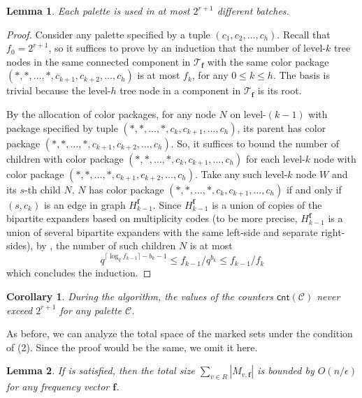 \documentclass[11pt,a4paper]{article}
\newtheorem{lemma}{Lemma}[section]
\newtheorem{corollary}{Corollary}[section]
\newcommand{\ceil}[1]{\lceil #1 \rceil}
\newcommand{\tree}{\mathcal{T}}
\newcommand{\freq}{\mathbf{f}}
\newcommand{\clr}{\mathcal{C}}
\newcommand{\cnt}{\mathsf{cnt}}
\begin{document}
\begin{lemma}\label{palette-cnt}
	Each palette is used in at most $2^{r+1}$ different batches.
\end{lemma}
\begin{proof}
	Consider any palette specified by a tuple $(c_1, c_2, \ldots, c_h)$. Recall that $f_0 = 2^{r+1}$, so it suffices to prove by an induction that the number of level-$k$ tree nodes in the same connected component in $\tree_\freq$ with the same color package $(*, *, \ldots, *, c_{k+1}, c_{k+2}, \ldots, c_h)$ is at most $f_k$, for any $0\leq k\leq h$. The basis is trivial because the level-$h$ tree node in a component in $\tree_{\freq}$ is its root.
	
	By the allocation of color packages, for any node $N$ on level-$(k-1)$ with package specified by tuple $(*, *, \ldots, *, c_k, c_{k+1}, \ldots, c_h)$, its parent has color package $(*, *, \ldots, *, c_{k+1}, c_{k+2}, \ldots, c_h)$. So, it suffices to bound the number of children with color package $(*, *, \ldots, *, c_k, c_{k+1}, \ldots, c_h)$ for each level-$k$ node with color package $(*, *, \ldots, *, c_{k+1}, c_{k+2}, \ldots, c_h)$. Take any such level-$k$ node $W$ and its $s$-th child $N$, $N$ has color package $(*, *, \ldots, *, c_k, c_{k+1}, \ldots, c_h)$ if and only if $(s, c_k)$ is an edge in graph $H_{k-1}^\freq$. Since $H_{k-1}^\freq$ is a union of copies of the bipartite expanders based on multiplicity codes (to be more precise, $H_{k-1}^\freq$ is a union of several bipartite expanders with the same left-side and separate right-sides), by , the number of such children $N$ is at most
	$$q^{\ceil{\log_q f_{k-1}} - b_k - 1} \leq f_{k-1} / q^{b_k} \leq f_{k-1} / f_k$$
	which concludes the induction.
\end{proof}


\begin{corollary}
	During the algorithm, the values of the counters $\cnt(\clr)$ never exceed $2^{r+1}$ for any palette $\clr$.
\end{corollary}

As before, we can analyze the total space of the marked sets under the condition of (2). Since the proof would be the same, we omit it here.

\begin{lemma}
	If  is satisfied, then the total size $\sum_{v\in R}|M_{v, \freq}|$ is bounded by $O(n/\epsilon)$ for any frequency vector $\freq$.
\end{lemma}
\end{document}
